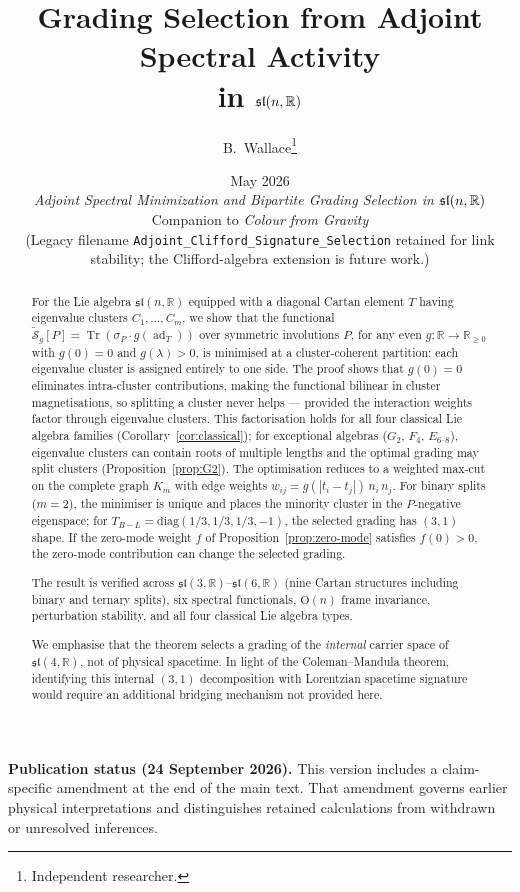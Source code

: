 \documentclass[11pt]{article}
\title{Grading Selection from Adjoint Spectral Activity\\
in $\sln{n}$}
\author{B.~Wallace\thanks{Independent researcher.}}
\date{May 2026 \\ \textit{Adjoint Spectral Minimization and Bipartite Grading Selection in $\sln{n}$} \\
Companion to \textit{Colour from Gravity} \\
{\footnotesize (Legacy filename \nolinkurl{Adjoint_Clifford_Signature_Selection} retained for link stability; the Clifford-algebra extension is future work.)}}
\theoremstyle{plain}
\theoremstyle{definition}
\theoremstyle{remark}
\newcommand{\sln}[1]{\mathfrak{sl}(#1,\mathbb{R})}
\newcommand{\TBL}{T_{B\!-\!L}}
\newcommand{\ad}{\operatorname{ad}}
\newcommand{\Tr}{\operatorname{Tr}}
\begin{document}
\maketitle

\begin{abstract}
For the Lie algebra $\sln{n}$ equipped with a diagonal Cartan
element $T$ having eigenvalue clusters $C_1, \ldots, C_m$, we show
that the functional
$\widetilde{\mathcal{S}}_g[P] = \Tr(\sigma_P \cdot g(\ad_T))$
over symmetric involutions $P$, for any even
$g : \mathbb{R} \to \mathbb{R}_{\ge 0}$ with $g(0) = 0$ and
$g(\lambda) > 0$, is minimised at a cluster-coherent partition:
each eigenvalue cluster is assigned entirely to one side.  The
proof shows that $g(0) = 0$ eliminates intra-cluster contributions,
making the functional bilinear in cluster magnetisations, so
splitting a cluster never helps --- provided the interaction weights
factor through eigenvalue clusters.  This factorisation holds for
all four classical Lie algebra families
(Corollary~\ref{cor:classical}); for exceptional algebras
($G_2$, $F_4$, $E_{6\text{--}8}$), eigenvalue clusters can contain
roots of multiple lengths and the optimal grading may split clusters
(Proposition~\ref{prop:G2}).  The optimisation reduces to a
weighted max-cut on the complete graph $K_m$ with edge weights
$w_{ij} = g(|t_i - t_j|)\,n_i\,n_j$.  For binary splits ($m = 2$),
the minimiser is unique and places the minority cluster in the
$P$-negative eigenspace; for $\TBL = \mathrm{diag}(1/3,1/3,1/3,-1)$,
the selected grading has $(3,1)$ shape.  If the zero-mode weight $f$
of Proposition~\ref{prop:zero-mode} satisfies $f(0) > 0$, the
zero-mode contribution can change the selected grading.

The result is verified across $\sln{3}$--$\sln{6}$ (nine Cartan
structures including binary and ternary splits), six spectral
functionals, $\mathrm{O}(n)$ frame invariance, perturbation
stability, and all four classical Lie algebra types.

We emphasise that the theorem selects a grading of the
\emph{internal} carrier space of $\sln{4}$, not of physical
spacetime.  In light of the Coleman--Mandula theorem, identifying
this internal $(3,1)$ decomposition with Lorentzian spacetime
signature would require an additional bridging mechanism not
provided here.
\end{abstract}
\par\smallskip\noindent\textbf{Publication status (24 September 2026).}
This version includes a claim-specific amendment at the end of the main text.
That amendment governs earlier physical interpretations and distinguishes
retained calculations from withdrawn or unresolved inferences.\par\smallskip
\end{document}

